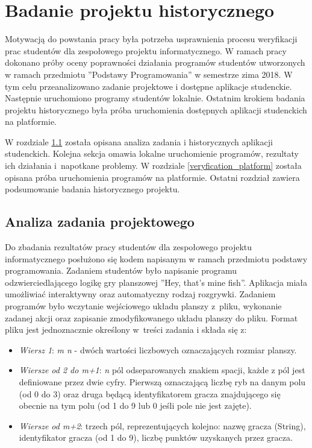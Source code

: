 \chapter{Badanie projektu historycznego}
\label{chapter:verify}

Motywacją do powstania pracy była potrzeba usprawnienia procesu weryfikacji prac studentów dla zespołowego projektu informatycznego.
W ramach pracy dokonano próby oceny poprawności działania programów studentów utworzonych w ramach przedmiotu ”Podstawy Programowania” w semestrze zima 2018.
W tym celu przeanalizowano zadanie projektowe i dostępne aplikacje studenckie.
Następnie uruchomiono programy studentów lokalnie.
Ostatnim krokiem badania projektu historycznego była próba uruchomienia dostępnych aplikacji studenckich na platformie.

W rozdziale \ref{analysis_students_projects} została opisana analiza zadania i historycznych aplikacji studenckich.
Kolejna sekcja omawia lokalne uruchomienie programów, rezultaty ich działania i~napotkane problemy.
W rozdziale \ref{veryfication_platform} została opisana próba uruchomienia programów na platformie.
Ostatni rozdział zawiera podsumowanie badania historycznego projektu.

\section{Analiza zadania projektowego}
\label{analysis_students_projects}

Do zbadania rezultatów pracy studentów dla zespołowego projektu informatycznego posłużono się kodem napisanym w ramach przedmiotu podstawy programowania.
Zadaniem studentów było napisanie programu odzwierciedlającego logikę gry planszowej ”Hey, that’s mine fish”.
Aplikacja miała umożliwiać interaktywny oraz automatyczny rodzaj rozgrywki.
Zadaniem programów było wczytanie wejściowego układu planszy z~pliku, wykonanie zadanej akcji oraz zapisanie zmodyfikowanego układu planszy do pliku.
Format pliku jest jednoznacznie określony w~treści zadania i składa się z:
\begin{itemize}
    \item \textit{Wiersz 1}: \textit{m n} - dwóch wartości liczbowych oznaczających rozmiar planszy.
    \item \textit{Wiersze od 2 do m+1}: \textit{n} pól odseparowanych znakiem spacji, każde z pól jest definiowane przez dwie cyfry.
    Pierwszą oznaczającą liczbę ryb na danym polu (od 0 do 3) oraz druga będącą identyfikatorem gracza znajdującego się obecnie na tym polu (od 1 do 9 lub 0 jeśli pole nie jest zajęte).
    \item \textit{Wiersze od m+2}: trzech pól, reprezentujących kolejno: nazwę gracza (String), identyfikator gracza (od 1 do 9), liczbę punktów uzyskanych przez gracza.
\end{itemize}

